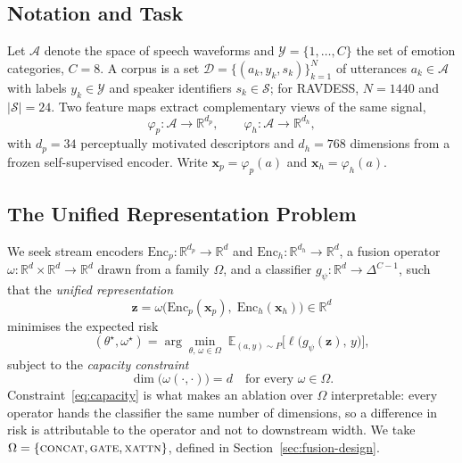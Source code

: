 \documentclass[journal,onecolumn,11pt,draftclsnofoot]{IEEEtran}   %
\begin{document}
\subsection{Notation and Task}
Let $\mathcal{A}$ denote the space of speech waveforms and
$\mathcal{Y}=\{1,\dots,C\}$ the set of emotion categories, $C = 8$. A corpus is
a set $\mathcal{D}=\{(a_k, y_k, s_k)\}_{k=1}^{N}$ of utterances $a_k \in
\mathcal{A}$ with labels $y_k \in \mathcal{Y}$ and speaker identifiers $s_k \in
\mathcal{S}$; for RAVDESS, $N = 1440$ and $|\mathcal{S}| = 24$. Two feature maps
extract complementary views of the same signal,
\begin{equation}
  \varphi_p : \mathcal{A} \rightarrow \mathbb{R}^{d_p}, \qquad
  \varphi_h : \mathcal{A} \rightarrow \mathbb{R}^{d_h},
  \label{eq:views}
\end{equation}
with $d_p = 34$ perceptually motivated descriptors and $d_h = 768$ dimensions
from a frozen self-supervised encoder. Write $\mathbf{x}_p = \varphi_p(a)$ and
$\mathbf{x}_h = \varphi_h(a)$.

\subsection{The Unified Representation Problem}
We seek stream encoders $\mathrm{Enc}_p : \mathbb{R}^{d_p}\!\rightarrow\!
\mathbb{R}^{d}$ and $\mathrm{Enc}_h : \mathbb{R}^{d_h}\!\rightarrow\!
\mathbb{R}^{d}$, a fusion operator $\omega : \mathbb{R}^{d} \times
\mathbb{R}^{d} \rightarrow \mathbb{R}^{d}$ drawn from a family $\Omega$, and a
classifier $g_\psi : \mathbb{R}^{d} \rightarrow \Delta^{C-1}$, such that the
\emph{unified representation}
\begin{equation}
  \mathbf{z} = \omega\big(\mathrm{Enc}_p(\mathbf{x}_p),\;
                          \mathrm{Enc}_h(\mathbf{x}_h)\big) \in \mathbb{R}^{d}
  \label{eq:unified}
\end{equation}
minimises the expected risk
\begin{equation}
  (\theta^\star\!, \omega^\star) = \arg\min_{\theta,\, \omega \in \Omega}\;
  \mathbb{E}_{(a,y)\sim P}\big[\ell\big(g_\psi(\mathbf{z}),\, y\big)\big],
  \label{eq:risk}
\end{equation}
subject to the \emph{capacity constraint}
\begin{equation}
  \dim\!\big(\omega(\cdot,\cdot)\big) = d \quad \text{for every } \omega \in
  \Omega .
  \label{eq:capacity}
\end{equation}
Constraint~\eqref{eq:capacity} is what makes an ablation over $\Omega$
interpretable: every operator hands the classifier the same number of
dimensions, so a difference in risk is attributable to the operator and not to
downstream width. We take $\Omega = \{\textsc{concat}, \textsc{gate},
\textsc{xattn}\}$, defined in Section~\ref{sec:fusion-design}.
\end{document}
